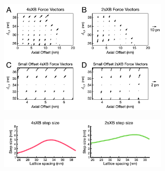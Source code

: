 \documentclass[11pt,titlepage]{article}
\begin{document}
\clearpage
\begin{figure}[ht]
    \begin{center}
    \includegraphics[width=3.25in]{../imgs/Figure4.pdf}
    \caption{
        \label{fig_forces}
            }
    \end{center}
\end{figure}

\clearpage
\begin{figure}[ht]
    \begin{center}
    \includegraphics[width=3.25in]{../imgs/FigureS1.pdf}
    \caption{
        \label{fig_step_size}
           }
    \end{center}
\end{figure}
\end{document}
